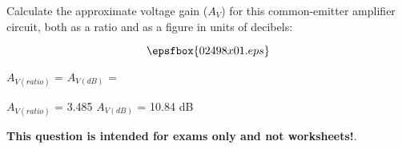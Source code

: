 

Calculate the approximate voltage gain ($A_V$) for this common-emitter amplifier circuit, both as a ratio and as a figure in units of decibels:

$$\epsfbox{02498x01.eps}$$

$A_{V(ratio)}$ = \hskip 80pt $A_{V(dB)}$ = 







$A_{V(ratio)}$ = 3.485 \hskip 50pt $A_{V(dB)}$ = 10.84 dB







{\bf This question is intended for exams only and not worksheets!}.




